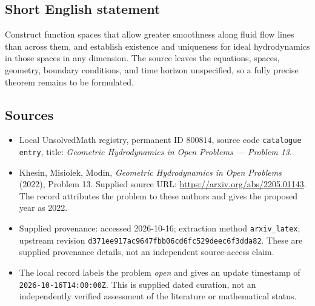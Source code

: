 \documentclass[11pt]{article}
\begin{document}
\subsection{Short English statement}
Construct function spaces that allow greater smoothness along fluid flow lines than across them, and establish existence and uniqueness for ideal hydrodynamics in those spaces in any dimension. The source leaves the equations, spaces, geometry, boundary conditions, and time horizon unspecified, so a fully precise theorem remains to be formulated.
\subsection{Sources}
\begin{itemize}
\item Local UnsolvedMath registry, permanent ID \(800814\), source code \texttt{catalogue entry}, title: \emph{Geometric Hydrodynamics in Open Problems --- Problem 13}.
\item Khesin, Misiolek, Modin, \emph{Geometric Hydrodynamics in Open Problems} (2022), Problem 13. Supplied source URL: \url{https://arxiv.org/abs/2205.01143}. The record attributes the problem to these authors and gives the proposed year as 2022.
\item Supplied provenance: accessed 2026-10-16; extraction method \texttt{arxiv\_latex}; upstream revision \texttt{d371ee917ac9647fbb06cd6fc529deec6f3dda82}. These are supplied provenance details, not an independent source-access claim.
\item The local record labels the problem \emph{open} and gives an update timestamp of \texttt{2026-10-16T14:00:00Z}. This is supplied dated curation, not an independently verified assessment of the literature or mathematical status.
\end{itemize}
\end{document}
